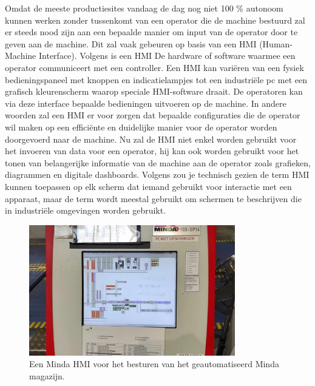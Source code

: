 Omdat de meeste productiesites vandaag de dag nog niet 100 \% autonoom kunnen werken zonder tussenkomt van een operator die de machine bestuurd zal er steeds nood zijn aan een bepaalde manier om input van de operator door te geven aan de machine. Dit zal vaak gebeuren op basis van een HMI (Human-Machine Interface). 
Volgens \textcite{Nist2025} is een HMI De hardware of software waarmee een operator communiceert met een controller. Een HMI kan variëren van een fysiek bedieningspaneel met knoppen en indicatielampjes tot een industriële pc met een grafisch kleurenscherm waarop speciale HMI-software draait. De operatoren kan via deze interface bepaalde bedieningen uitvoeren op de machine. In andere woorden zal een HMI er voor zorgen dat bepaalde configuraties die de operator wil maken op een efficiënte en duidelijke manier voor de operator worden doorgevoerd naar de machine. 
Nu zal de HMI niet enkel worden gebruikt voor het invoeren van data voor een operator, hij kan ook worden gebruikt voor het tonen van belangerijke informatie van de machine aan de operator zoals grafieken, diagrammen en digitale dashboards. \autocite{Inductive2025}
Volgens \textcite{Copadata2025} zou je technisch gezien de term HMI kunnen toepassen op elk scherm dat iemand gebruikt voor interactie met een apparaat, maar de term wordt meestal gebruikt om schermen te beschrijven die in industriële omgevingen worden gebruikt.

\begin{figure}[H]
    \centering
    \includegraphics[width=0.8\textwidth]{fotos/Minda_HMI.jpg}
    \caption[Minda HMI]{\label{fig:grail}Een Minda HMI voor het besturen van het geautomatiseerd Minda magazijn.}
\end{figure} 

